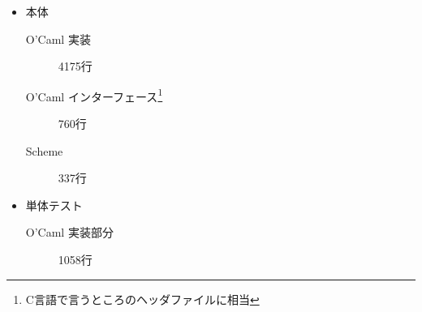 \documentclass[twocolumn,a4paper,10pt]{jsarticle}
\newcommand{\texthline}{\par\vskip 2pt\rule{0.4\textwidth}{0.5pt}\vskip 2pt\par}
\begin{document}
\begin{itemize}
    \item 本体
    \begin{description}
    \item[O'Caml 実装] 4175行
    \item[O'Caml インターフェース\footnote{C言語で言うところのヘッダファイルに相当}] 760行 %
    \item[Scheme] 337行
    \end{description}

    \item 単体テスト
    \begin{description}
    \item[O'Caml 実装部分] 1058行
    \end{description}
\end{itemize}




\end{document}
